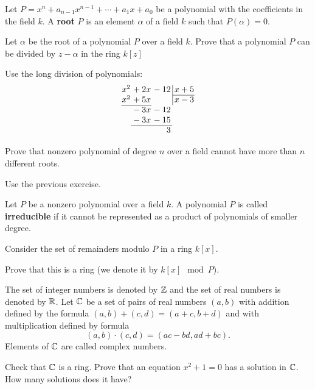 \documentclass[12pt]{article}
\begin{document}
Let $P= x^n + a_{n-1} x^{n-1} + \cdots + a_1 x + a_0$ be a polynomial
with the coefficients in the field $k$. A {\bf root} $P$ is an
element $\alpha$ of a field $k$ such that $P(\alpha)=0$.

\begin{zadacha} Let $\alpha$ be the root of a polynomial $P$ over a
  field $k$. Prove that a polynomial $P$ can be divided by $z-\alpha$
  in the ring $k[z]$
\end{zadacha}

\begin{ukazanie} Use the long division of polynomials:
$$
\arraycolsep=0.05em
\begin{array}{rrr@{\,}r|r}
x^2&{}+2x&{}-12&&\,x+5\\
\cline{5-5}
x^2&{}+5x&&&\,x-3\\
\cline{1-2}
&{}-3x&{}-12\\
&{}-3x&{}-15\\
\cline{2-3}
&&3
\end{array}
$$
\end{ukazanie}

\begin{zadacha} Prove that nonzero polynomial of degree $n$ over a
  field cannot have more than $n$ different roots.
\end{zadacha}

\begin{ukazanie} Use the previous exercise.
\end{ukazanie}

Let $P$ be a nonzero polynomial over a field $k$. A polynomial $P$
 is called {\bf irreducible} if it cannot be represented as a product
 of polynomials of smaller degree.

Consider the set of remainders modulo $P$ in a ring $k[x]$.

\begin{zadacha} Prove that this is a ring (we denote it by $k[x] \mod
  P$).
\end{zadacha}


The set of integer numbers is denoted by ${\mathbb Z}$ and the set of real
numbers is denoted by ${\mathbb R}$. Let ${\mathbb C}$ be a set of pairs of real numbers
$(a,b)$ with addition defined by the formula $(a, b)+(c,d) = (a+c,
b+d)$ and with multiplication defined by formula
$$
(a, b) \cdot (c,d) = (ac - bd, ad + bc).
$$
Elements of ${\mathbb C}$ are called complex numbers.

\begin{zadacha} Check that ${\mathbb C}$ is a ring. Prove that an equation
  $x^2+1=0$ has a solution in ${\mathbb C}$. How many solutions does it have?
\end{zadacha}
\end{document}
